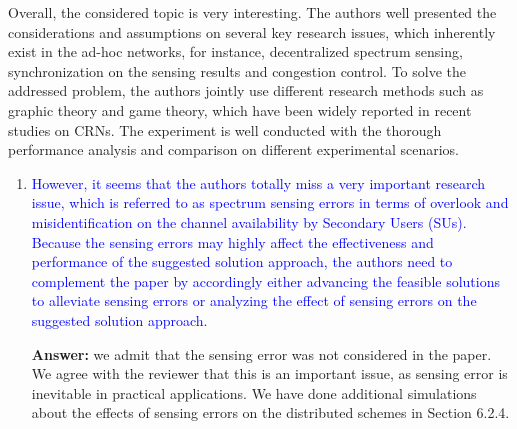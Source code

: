 \documentclass[10pt,a4paper]{article}
\begin{document}
Overall, the considered topic is very interesting. The authors well presented the considerations and assumptions on several key research issues, which inherently exist in the ad-hoc networks, for instance, decentralized spectrum sensing, synchronization on the sensing results and congestion control. To solve the addressed problem, the authors jointly use different research methods such as graphic theory and game theory, which have been widely reported in recent studies on CRNs. The experiment is well conducted with the thorough performance analysis and comparison on different experimental scenarios.
\begin{enumerate}
\item \textcolor{blue}{ However, it seems that the authors totally miss a very important research issue, which is referred to as spectrum sensing errors in terms of overlook and misidentification on the channel availability by Secondary Users (SUs). Because the sensing errors may highly affect the effectiveness and performance of the suggested solution approach, the authors need to complement the paper by accordingly either advancing the feasible solutions to alleviate sensing errors or analyzing the effect of sensing errors on the suggested solution approach.}

 \textbf{Answer:} we admit that the sensing error was not considered in the paper.
We agree with the reviewer that this is an important issue, as sensing error is inevitable in practical applications.
We have done additional simulations about the effects of sensing errors on the distributed schemes in Section 6.2.4.
\end{enumerate}

%


\end{document}
